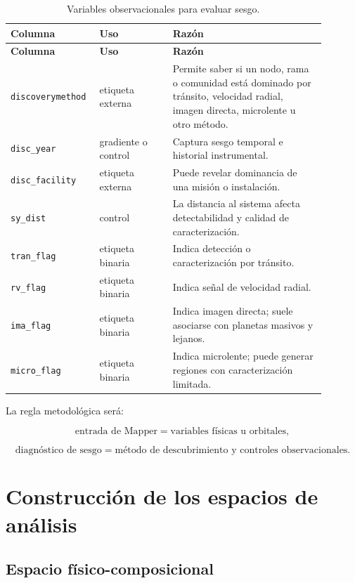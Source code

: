 \documentclass[11pt,letterpaper]{article}
\begin{document}
\begin{longtable}{p{0.21\linewidth}p{0.22\linewidth}p{0.46\linewidth}}
\caption{Variables observacionales para evaluar sesgo.}\\
\toprule
\textbf{Columna} & \textbf{Uso} & \textbf{Razón} \\
\midrule
\endfirsthead
\toprule
\textbf{Columna} & \textbf{Uso} & \textbf{Razón} \\
\midrule
\endhead
\texttt{discoverymethod} & etiqueta externa & Permite saber si un nodo, rama o comunidad está dominado por tránsito, velocidad radial, imagen directa, microlente u otro método. \\
\texttt{disc\_year} & gradiente o control & Captura sesgo temporal e historial instrumental. \\
\texttt{disc\_facility} & etiqueta externa & Puede revelar dominancia de una misión o instalación. \\
\texttt{sy\_dist} & control & La distancia al sistema afecta detectabilidad y calidad de caracterización. \\
\texttt{tran\_flag} & etiqueta binaria & Indica detección o caracterización por tránsito. \\
\texttt{rv\_flag} & etiqueta binaria & Indica señal de velocidad radial. \\
\texttt{ima\_flag} & etiqueta binaria & Indica imagen directa; suele asociarse con planetas masivos y lejanos. \\
\texttt{micro\_flag} & etiqueta binaria & Indica microlente; puede generar regiones con caracterización limitada. \\
\bottomrule
\end{longtable}

La regla metodológica será:

\begin{equation}
\text{entrada de Mapper} = \text{variables físicas u orbitales},
\end{equation}

\begin{equation}
\text{diagnóstico de sesgo} = \text{método de descubrimiento y controles observacionales}.
\end{equation}

\section{Construcción de los espacios de análisis}

\subsection{Espacio físico-composicional}
\end{document}
